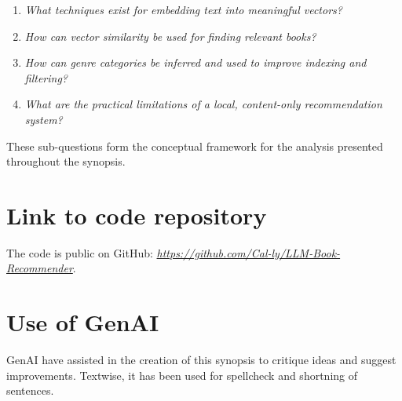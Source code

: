 \begin{enumerate}
    \item \label{itm:subq-embedding} \textit{What techniques exist for embedding text into meaningful vectors?}
    \item \label{itm:subq-similarity} \textit{How can vector similarity be used for finding relevant books?}
    \item \label{itm:subq-classification} \textit{How can genre categories be inferred and used to improve indexing and filtering?}
    \item \label{itm:subq-limitations} \textit{What are the practical limitations of a local, content-only recommendation system?}
\end{enumerate}

These sub-questions form the conceptual framework for the analysis presented throughout the synopsis.

\section{Link to code repository}
The code is public on GitHub: \href{https://github.com/Cal-ly/LLM-Book-Recommender}{\textit{https://github.com/Cal-ly/LLM-Book-Recommender}}.

\section{Use of GenAI}
\label{sec:use-of-genai}
GenAI have assisted in the creation of this synopsis to critique ideas and suggest improvements.
Textwise, it has been used for spellcheck and shortning of sentences.